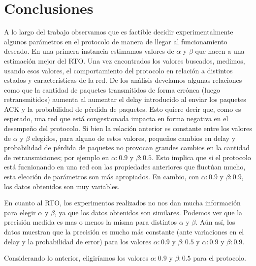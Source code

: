 \section{Conclusiones}
A lo largo del trabajo observamos que es factible decidir experimentalmente algunos parámetros en el protocolo de manera de llegar al funcionamiento deseado. En una primera instancia estimamos valores de $\alpha$ y $\beta$ que hacen a una estimación mejor del RTO. Una vez encontrados los valores buscados, medimos, usando esos valores, el comportamiento del protocolo en relación a distintos estados y características de la red. De los análisis develamos algunas relaciones como que la cantidad de paquetes transmitidos de forma errónea  (luego retransmitidos) aumenta al aumentar el delay introducido al enviar los paquetes ACK y la probabilidad de pérdida de paquetes. Esto quiere decir que, como es esperado, una red que está congestionada impacta en forma negativa en el desempeño del protocolo. Si bien la relación anterior es constante entre los valores de $\alpha$ y $\beta$ elegidos, para alguno de estos valores, pequeños cambios en delay y probabilidad de pérdida de paquetes no provocan grandes cambios en la cantidad de retransmiciones; por ejemplo en $\alpha:0.9$ y $\beta:0.5$. Esto implica que si el protocolo está fucnionando en una red con las propiedades anteriores que fluctúan mucho, esta elección de parámetros son más apropiados. En cambio, con  $\alpha:0.9$ y $\beta:0.9$, los datos obtenidos son muy variables.\\
\par En cuanto al RTO, los experimentos realizados no nos dan mucha información para elegir $\alpha$ y $\beta$, ya que los datos obtenidos son similares. Podemos ver que la precisión medida es mas o menos la misma para distintos $\alpha$ y $\beta$. Aún así, los datos muestran que la precisión es mucho más constante (ante variaciones en el delay y la probabilidad de error) para los valores  $\alpha:0.9$ y $\beta:0.5$ y  $\alpha:0.9$ y $\beta:0.9$.
\par Considerando lo anterior, eligiríamos los valores  $\alpha:0.9$ y $\beta:0.5$ para el protocolo.

